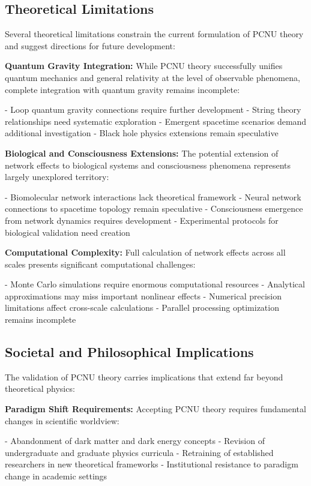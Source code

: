 \documentclass[11pt,a4paper]{article}
\begin{document}
\subsection{Theoretical Limitations}

Several theoretical limitations constrain the current formulation of PCNU theory and suggest directions for future development:

\textbf{Quantum Gravity Integration:}
While PCNU theory successfully unifies quantum mechanics and general relativity at the level of observable phenomena, complete integration with quantum gravity remains incomplete:

- Loop quantum gravity connections require further development
- String theory relationships need systematic exploration
- Emergent spacetime scenarios demand additional investigation
- Black hole physics extensions remain speculative

\textbf{Biological and Consciousness Extensions:}
The potential extension of network effects to biological systems and consciousness phenomena represents largely unexplored territory:

- Biomolecular network interactions lack theoretical framework
- Neural network connections to spacetime topology remain speculative
- Consciousness emergence from network dynamics requires development
- Experimental protocols for biological validation need creation

\textbf{Computational Complexity:}
Full calculation of network effects across all scales presents significant computational challenges:

- Monte Carlo simulations require enormous computational resources
- Analytical approximations may miss important nonlinear effects
- Numerical precision limitations affect cross-scale calculations
- Parallel processing optimization remains incomplete

\subsection{Societal and Philosophical Implications}

The validation of PCNU theory carries implications that extend far beyond theoretical physics:

\textbf{Paradigm Shift Requirements:}
Accepting PCNU theory requires fundamental changes in scientific worldview:

- Abandonment of dark matter and dark energy concepts
- Revision of undergraduate and graduate physics curricula
- Retraining of established researchers in new theoretical frameworks
- Institutional resistance to paradigm change in academic settings
\end{document}
